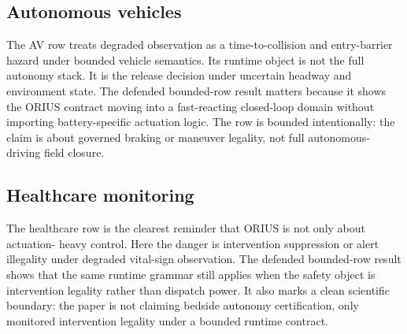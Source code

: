 \subsection{Autonomous vehicles}
The AV row treats degraded observation as a time-to-collision and entry-barrier hazard
under bounded vehicle semantics. Its runtime object is not the full autonomy stack. It
is the release decision under uncertain headway and environment state. The defended
bounded-row result matters because it shows the ORIUS contract moving into a
fast-reacting closed-loop domain without importing battery-specific actuation logic. The
row is bounded intentionally: the claim is about governed braking or maneuver legality,
not full autonomous-driving field closure.

\subsection{Healthcare monitoring}
The healthcare row is the clearest reminder that ORIUS is not only about actuation-
heavy control. Here the danger is intervention suppression or alert illegality under
degraded vital-sign observation. The defended bounded-row result shows that the same
runtime grammar still applies when the safety object is intervention legality rather
than dispatch power. It also marks a clean scientific boundary: the paper is not
claiming bedside autonomy certification, only monitored intervention legality under a
bounded runtime contract.
